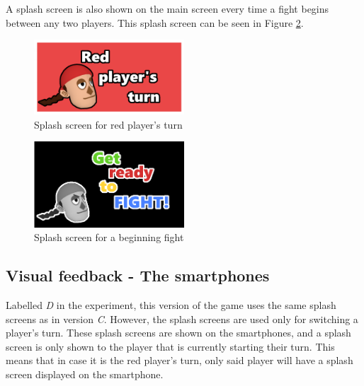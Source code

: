A splash screen is also shown on the main screen every time a fight begins between any two players. This splash screen can be seen in Figure \ref{fig:fight_splash}.

\begin{figure}[h!]
	\centering
	\includegraphics[width=0.5\textwidth]{figures/redturn.png}
	\caption{Splash screen for red player's turn}\label{fig:redturn}
\end{figure}

\begin{figure}[h!]
	\centering
	\includegraphics[width=0.5\textwidth]{figures/getready.png}
	\caption{Splash screen for a beginning fight}\label{fig:fight_splash}
\end{figure}

\subsection{Visual feedback - The smartphones}\label{sub:visual_smartphone}
Labelled \textit{D} in the experiment, this version of the game uses the same splash screens as in version \textit{C}. However, the splash screens are used only for switching a player's turn. These splash screens are shown on the smartphones, and a splash screen is only shown to the player that is currently starting their turn. This means that in case it is the red player's turn, only said player will have a splash screen displayed on the smartphone.